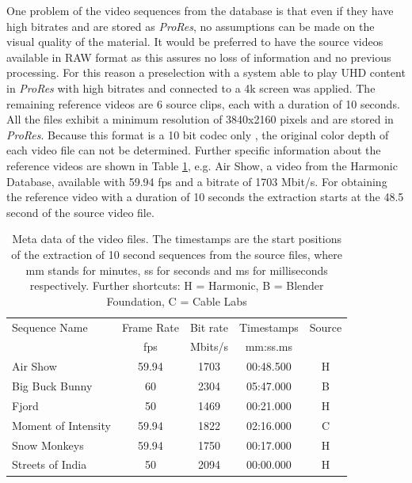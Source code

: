 One problem of the video sequences from the database is that even if they have high bitrates and are stored as \textit{ProRes}, no assumptions can be made on the visual quality of the material. It would be preferred to have the source videos available in RAW format as this assures no loss of information and no previous processing.
For this reason a preselection with a system able to play UHD content in \textit{ProRes} with high bitrates and connected to a 4k screen was applied.
The remaining reference videos are 6 source clips, each with a duration of 10 seconds. All the files exhibit a minimum resolution of 3840x2160 pixels and are stored in \textit{ProRes}. Because this format is a 10 bit codec only \cite{web:ProRes}, the original color depth of each video file can not be determined.
Further specific information about the reference videos are shown in Table \ref{tab:Specifications}, e.g. Air Show, a video from the Harmonic Database, available with 59.94 fps and a bitrate of 1703 Mbit/s. For obtaining the reference video with a duration of 10 seconds the extraction starts at the 48.5 second of the source video file.

\begin{table}[hbt!]
	\renewcommand{\arraystretch}{1.3}
	\centering
	\caption{Meta data of the video files. The timestamps are the start positions of the extraction of 10 second sequences from the source files, where mm stands for minutes, ss for seconds and ms for milliseconds respectively. Further shortcuts: H = Harmonic, B = Blender Foundation, C = Cable Labs}
	\label{tab:Specifications}
	\begin{tabular}{lcccc}
		\toprule
		Sequence Name       & Frame Rate & Bit rate & Timestamps & Source\\
		& fps  	   & Mbits/s    & mm:ss.ms   & \\
		\midrule
		Air Show            & 59.94    & 1703 & 00:48.500  &   H  \\
		Big Buck Bunny      & 60       & 2304 & 05:47.000  &   B  \\
		Fjord               & 50       & 1469 & 00:21.000  &   H  \\
		Moment of Intensity & 59.94    & 1822 & 02:16.000  &   C \\
		Snow Monkeys        & 59.94    & 1750 & 00:17.000  &   H  \\
		Streets of India    & 50       & 2094 & 00:00.000  &   H  \\
		\bottomrule
	\end{tabular}
\end{table}


